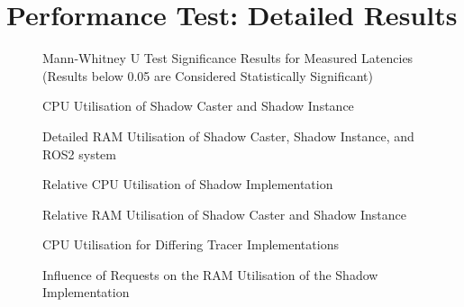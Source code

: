 \chapter{Performance Test: Detailed Results}

\begin{figure}[h]
    \centering
    
    \caption[Mann-Whitney U Test: Significance Results for Measured Latencies]{Mann-Whitney U Test Significance Results for Measured Latencies (Results below 0.05 are Considered Statistically Significant)} \label{app:mwtest}
\end{figure}


\begin{figure}[h]
    \centering
    
    \caption{CPU Utilisation of Shadow Caster and Shadow Instance} \label{app:cpuUsageStreamDetailed}
\end{figure}

\begin{figure}[h]
    \centering
    
    \caption{Detailed RAM Utilisation of Shadow Caster, Shadow Instance, and ROS2 system} \label{app:ramUsageDetailed}
\end{figure}


\begin{figure}[h]
    \centering
    
    \caption[Relative CPU Utilisation of Shadow Implementation]{Relative CPU Utilisation of Shadow Implementation} \label{app:cpuUsageStreamRelative}
\end{figure}

\begin{figure}[h]
    \centering
    
    \caption{Relative RAM Utilisation of Shadow Caster and Shadow Instance} \label{app:ramUsageStreamRelative}
\end{figure}

\begin{figure}[h]
    \centering
    
    \caption{CPU Utilisation for Differing Tracer Implementations} \label{app:eventProbLatencyCPU}
\end{figure}

\begin{figure}[h]
    \centering
    
    \caption{Influence of Requests on the RAM Utilisation of the Shadow Implementation} \label{app:aggregationOverheadRAM}
\end{figure}


